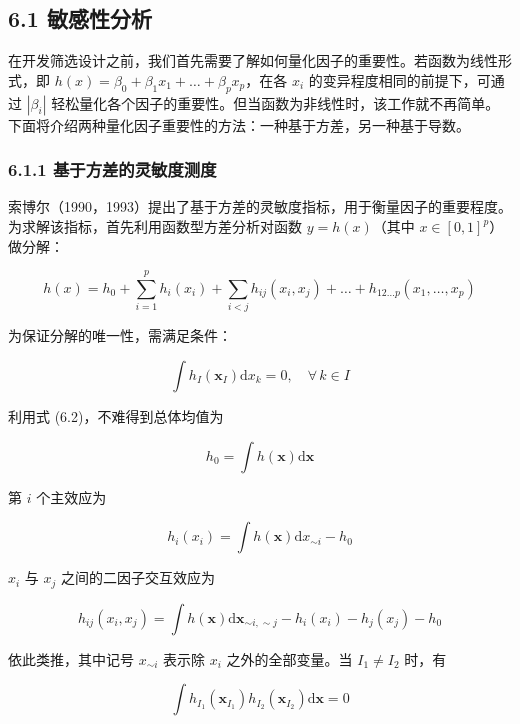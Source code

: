 \documentclass{ctexart}
\begin{document}
\subsection*{6.1 敏感性分析}

在开发筛选设计之前，我们首先需要了解如何量化因子的重要性。若函数为线性形式，即 $h(x) = \beta_0+\beta_1x_1+\dots+\beta_px_p$，在各 $x_i$ 的变异程度相同的前提下，可通过 $|\beta_i|$ 轻松量化各个因子的重要性。但当函数为非线性时，该工作就不再简单。下面将介绍两种量化因子重要性的方法：一种基于方差，另一种基于导数。

\subsubsection*{6.1.1 基于方差的灵敏度测度}

索博尔（1990，1993）提出了基于方差的灵敏度指标，用于衡量因子的重要程度。为求解该指标，首先利用函数型方差分析对函数 $y=h(x)$（其中 $x\in[0,1]^p$）做分解：

\begin{equation*}
h(x)=h_0+\sum_{i=1}^{p}h_i(x_i)+\sum_{i<j}h_{ij}(x_i,x_j)+\dots+h_{12\dots p}(x_1,\dots,x_p)
\tag{6.1}
\end{equation*}

为保证分解的唯一性，需满足条件：

\begin{equation*}
\int h_I(\boldsymbol{x}_I)\mathrm{d}x_k=0,\quad\forall\,k\in I
\tag{6.2}
\end{equation*}

利用式 (6.2)，不难得到总体均值为

\begin{equation*}
h_0=\int h(\boldsymbol{x})\mathrm{d}\boldsymbol{x}
\end{equation*}

第 $i$ 个主效应为

\begin{equation*}
h_i(x_i)=\int h(\boldsymbol{x})\mathrm{d}x_{\sim i}-h_0
\end{equation*}

$x_i$ 与 $x_j$ 之间的二因子交互效应为

\begin{equation*}
h_{ij}(x_i,x_j)=\int h(\boldsymbol{x})\mathrm{d}\boldsymbol{x}_{\sim i,\sim j}-h_i(x_i)-h_j(x_j)-h_0
\end{equation*}

依此类推，其中记号 $x_{\sim i}$ 表示除 $x_i$ 之外的全部变量。当 $I_1\neq I_2$ 时，有

\begin{equation*}
\int h_{I_1}(\boldsymbol{x}_{I_1})h_{I_2}(\boldsymbol{x}_{I_2})\mathrm{d}\boldsymbol{x}=0
\end{equation*}
\end{document}
